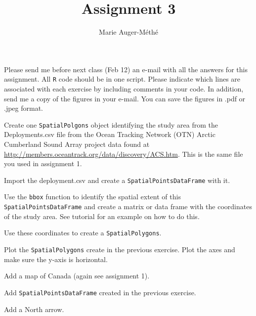 \documentclass[11pt, oneside]{article}   	%
\title{Assignment 3}
\author{Marie Auger-M\'eth\'e}
\date{}							%
\begin{document}
\maketitle

Please send me before next class (Feb 12) an e-mail with all the answers for this assignment. All \texttt{R} code should be in one script. Please indicate which lines are associated with each exercise by including comments in your code. In addition, send me a copy of the figures in your e-mail. You can save the figures in .pdf or .jpeg format.

\begin{Exercise}

Create one \texttt{SpatialPolgons} object identifying the study area from the Deployments.csv file from the Ocean Tracking Network (OTN) Arctic Cumberland Sound Array project data found at \url{http://members.oceantrack.org/data/discovery/ACS.htm}. This is the same file you used in assignment 1.

\Question
Import the deployment.csv  and create a \texttt{SpatialPointsDataFrame} with it.

\Question Use the \texttt{bbox} function to  identify the spatial extent of this \texttt{SpatialPointsDataFrame} and create a matrix or data frame with the coordinates of the study area. See tutorial for an example on how to do this.

\Question Use these coordinates to create a \texttt{SpatialPolygons}.

\end{Exercise}

\begin{Exercise}

\Question Plot the \texttt{SpatialPolygons} create in the previous exercise. Plot the axes and make sure the y-axis is horizontal.

\Question Add a map of Canada (again see assignment 1). 

\Question Add \texttt{SpatialPointsDataFrame} created in the previous exercise.

\Question Add a North arrow.

\end{Exercise}
\end{document}
